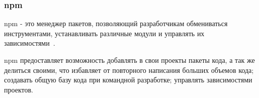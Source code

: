 \subsubsection{npm}

npm - это менеджер пакетов, позволяющий разработчикам обмениваться инструментами, устанавливать различные модули и управлять их зависимостями~\cite{npm}.

npm предоставляет возможность добавлять в свои проекты пакеты кода, а так же делиться своими, что избавляет от повторного написания больших объемов кода; создавать общую базу кода при командной разработке; управлять зависимостями проектов.